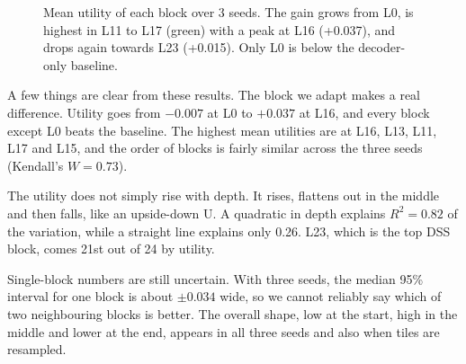 \documentclass[11pt,a4paper]{report}
\begin{document}
\begin{figure}[t]
\centering
{}
\caption{Mean utility of each block over 3 seeds. The gain grows from L0, is highest in L11 to L17 (green) with a peak at L16 (+0.037), and drops again towards L23 (+0.015). Only L0 is below the decoder-only baseline.}
\label{fig:utility}
\end{figure}

A few things are clear from these results. The block we adapt makes a real difference. Utility goes from $-0.007$ at L0 to $+0.037$ at L16, and every block except L0 beats the baseline. The highest mean utilities are at L16, L13, L11, L17 and L15, and the order of blocks is fairly similar across the three seeds (Kendall's $W = 0.73$).

The utility does not simply rise with depth. It rises, flattens out in the middle and then falls, like an upside-down U. A quadratic in depth explains $R^2 = 0.82$ of the variation, while a straight line explains only 0.26. L23, which is the top DSS block, comes 21st out of 24 by utility.

Single-block numbers are still uncertain. With three seeds, the median 95\% interval for one block is about $\pm 0.034$ wide, so we cannot reliably say which of two neighbouring blocks is better. The overall shape, low at the start, high in the middle and lower at the end, appears in all three seeds and also when tiles are resampled.
\end{document}
